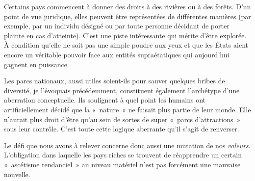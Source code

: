 {Certains pays commencent à donner des droits à des rivières ou à des forêts. D'un point de vue juridique, elles peuvent être représentées de différentes manières (par exemple, par un individu désigné ou par toute personne décidant de porter plainte en cas d'atteinte). C'est une piste intéressante qui mérite d'être explorée. À condition qu'elle ne soit pas une simple poudre aux yeux et que les États aient encore un véritable pouvoir face aux entités supraétatiques qui aujourd'hui gagnent en puissance.

Les parcs nationaux, aussi utiles soient-ils pour sauver quelques bribes de diversité, je l'évoquais précédemment, constituent également l'archétype d'une aberration conceptuelle. Ils soulignent à quel point les humains ont artificiellement décidé que la «~nature~» ne faisait plus partie de leur monde. Elle n'aurait plus droit d'être qu'au sein de sortes de super «~parcs d'attractions~» sous leur contrôle. C'est toute cette logique aberrante qu'il s'agit de renverser.

Le défi que nous avons à relever concerne donc aussi une mutation de nos \emph{valeurs}. L'obligation dans laquelle les pays riches se trouvent de réapprendre un certain «~ascétisme tendanciel~» au niveau matériel n'est pas forcément une mauvaise nouvelle.

}

